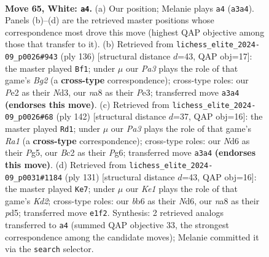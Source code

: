 \documentclass[11pt]{article}
\begin{document}
\clearpage

\begin{figure}[p]\centering
\begin{subfigure}{0.46\textwidth}\centering
\resizebox{\linewidth}{!}{%
\newchessgame
\chessboard[
  setfen={n7/3n4/1b1N3k/p2p4/8/PP2P2p/2B1P3/4K3 w - - 0 65},
  showmover=false,
  pgfstyle=straightmove, color=movearrow, markmove={a3-a4}
]}
\caption{}
\end{subfigure}\hfill
\begin{subfigure}{0.46\textwidth}\centering
\resizebox{\linewidth}{!}{%
\newchessgame
\chessboard[
  setfen={8/2k2n2/p1pbp3/P7/1P1P3p/1K1NP3/6B1/8 w - - 8 69},
  showmover=false,
  pgfstyle=straightmove, color=movearrow, markmove={g2-f1}
]}
\caption{}
\end{subfigure}
\\[4pt]
\begin{subfigure}{0.46\textwidth}\centering
\resizebox{\linewidth}{!}{%
\newchessgame
\chessboard[
  setfen={4k3/2n3p1/3b2P1/1p3KP1/1P6/2P5/8/R7 w - - 13 72},
  showmover=false,
  pgfstyle=straightmove, color=movearrow, markmove={a1-d1}
]}
\caption{}
\end{subfigure}\hfill
\begin{subfigure}{0.46\textwidth}\centering
\resizebox{\linewidth}{!}{%
\newchessgame
\chessboard[
  setfen={8/3k4/1p1n1p2/1p1P1Pp1/8/2P1K1N1/8/8 b - - 10 66},
  showmover=false,
  pgfstyle=straightmove, color=movearrow, markmove={d7-e7}
]}
\caption{}
\end{subfigure}
\caption{\textbf{Move 65, White: \texttt{a4}.} (a) Our position; Melanie plays \texttt{a4} (\texttt{a3a4}). Panels (b)--(d) are the retrieved master positions whose correspondence most drove this move (highest QAP objective among those that transfer to it). (b) Retrieved from \texttt{lichess\_elite\_2024-09\_p0026\#943} (ply 136) [structural distance $d$=43, QAP obj=17]: the master played \texttt{Bf1}; under $\mu$ our \emph{Pa3} plays the role of that game's \emph{Bg2} (a \textbf{cross-type} correspondence); cross-type roles: our \emph{P}e2 as their \emph{N}d3, our \emph{n}a8 as their \emph{P}e3; transferred move \texttt{a3a4} \textbf{(endorses this move)}. (c) Retrieved from \texttt{lichess\_elite\_2024-09\_p0026\#68} (ply 142) [structural distance $d$=37, QAP obj=16]: the master played \texttt{Rd1}; under $\mu$ our \emph{Pa3} plays the role of that game's \emph{Ra1} (a \textbf{cross-type} correspondence); cross-type roles: our \emph{N}d6 as their \emph{P}g5, our \emph{B}c2 as their \emph{P}g6; transferred move \texttt{a3a4} \textbf{(endorses this move)}. (d) Retrieved from \texttt{lichess\_elite\_2024-09\_p0031\#1184} (ply 131) [structural distance $d$=43, QAP obj=16]: the master played \texttt{Ke7}; under $\mu$ our \emph{Ke1} plays the role of that game's \emph{Kd2}; cross-type roles: our \emph{b}b6 as their \emph{N}d6, our \emph{n}a8 as their \emph{p}d5; transferred move \texttt{e1f2}. Synthesis: 2 retrieved analogs transferred to \texttt{a4} (summed QAP objective 33, the strongest correspondence among the candidate moves); Melanie committed it via the \texttt{search} selector.}
\label{fig:thought-m128}
\end{figure}
\end{document}
